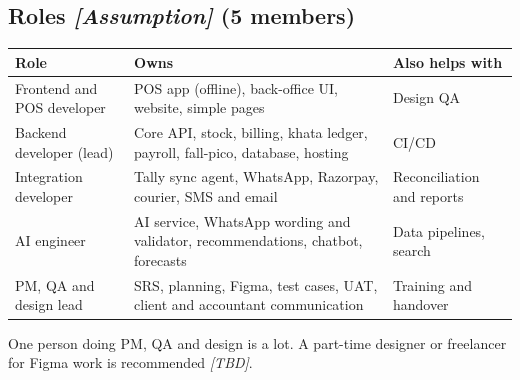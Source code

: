 \documentclass[11pt,a4paper]{article}
\newcommand{\assump}{\textit{[Assumption]}}
\newcommand{\tbd}{\textit{[TBD]}}
\newcommand{\hdr}{\rowcolor{hdrgray}\bfseries}
\begin{document}
\subsection{Roles \assump{} (5 members)}
\begin{longtable}{L{3.6cm}L{8.2cm}L{4.7cm}}
\hdr Role & Owns & Also helps with \\ \endhead
Frontend and POS developer & POS app (offline), back-office UI, website, simple pages & Design QA \\
Backend developer (lead) & Core API, stock, billing, khata ledger, payroll, fall-pico, database, hosting & CI/CD \\
Integration developer & Tally sync agent, WhatsApp, Razorpay, courier, SMS and email & Reconciliation and reports \\
AI engineer & AI service, WhatsApp wording and validator, recommendations, chatbot, forecasts & Data pipelines, search \\
PM, QA and design lead & SRS, planning, Figma, test cases, UAT, client and accountant communication & Training and handover \\
\end{longtable}
One person doing PM, QA and design is a lot. A part-time designer or freelancer for Figma work is recommended \tbd.
\end{document}
